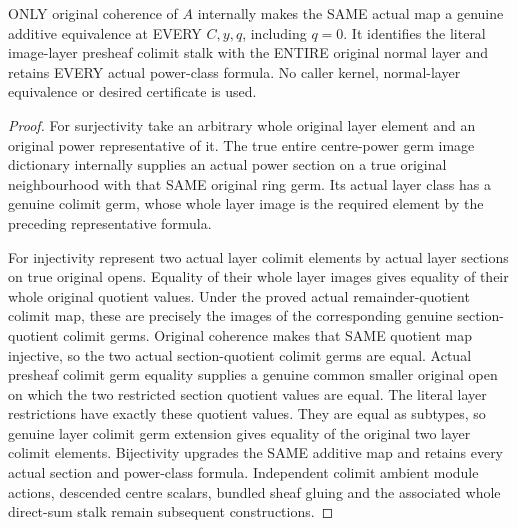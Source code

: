 \begin{theorem}
\label{hir:real-domain-actual-normal-layer-whole-stalk-equivalence}
\leanok
ONLY original coherence of $A$ internally makes the SAME actual map a
genuine additive equivalence at EVERY $C,y,q$, including $q=0$. It
identifies the literal image-layer presheaf colimit stalk with the ENTIRE
original normal layer and retains EVERY actual power-class formula.
No caller kernel, normal-layer equivalence or desired certificate is used.
\end{theorem}
\begin{proof}
For surjectivity take an arbitrary whole original layer element and an
original power representative of it. The true entire centre-power germ
image dictionary internally supplies an actual power section on a true
original neighbourhood with that SAME original ring germ. Its actual
layer class has a genuine colimit germ, whose whole layer image is the
required element by the preceding representative formula.

For injectivity represent two actual layer colimit elements by actual
layer sections on true original opens. Equality of their whole layer
images gives equality of their whole original quotient values. Under the
proved actual remainder-quotient colimit map, these are precisely the
images of the corresponding genuine section-quotient colimit germs.
Original coherence makes that SAME quotient map injective, so the two
actual section-quotient colimit germs are equal. Actual presheaf colimit
germ equality supplies a genuine common smaller original open on which
the two restricted section quotient values are equal. The literal layer
restrictions have exactly these quotient values. They are equal as
subtypes, so genuine layer colimit germ extension gives equality of the
original two layer colimit elements. Bijectivity upgrades the SAME
additive map and retains every actual section and power-class formula.
Independent colimit ambient module actions, descended centre scalars,
bundled sheaf gluing and the associated whole direct-sum stalk remain
subsequent constructions.
\end{proof}
